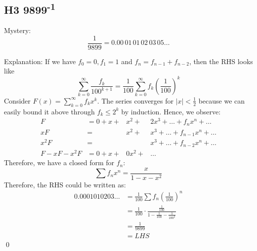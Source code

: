 \documentclass[12pt]{article}
\begin{document}
\subsection{H3 9899\textsuperscript{-1}}
Mystery: \[\frac{1}{9899}=0.00\,01\,01\,02\,03\,05\dots\]

Explanation: If we have $f_0=0, f_1=1$ and $f_n=f_{n-1}+f_{n-2}$, then the RHS looks like \[\sum_{k=0}^{\infty}\frac{f_k}{100^{k+1}}=\frac{1}{100}\sum_{k=0}^{\infty}f_k\left(\frac{1}{100}\right)^k\]
Consider \(F(x)=\sum_{k=0}^{\infty}f_kx^k\). The series converges for $|x|<\frac{1}{2}$ because we can easily bound it above through $f_k\leq 2^k$ by induction. Hence, we observe:\[\begin{array}{rlll}
    F &= 0+x+ & x^2+  & 2x^3+\dots +f_nx^n+\dots \\
    xF &= & x^2+ & x^3+\dots +f_{n-1}x^n+\dots\\
    x^2F &= & & x^3+\dots +f_{n-2}x^n+\dots\\ \hline
    F-xF-x^2F &= 0+x + & 0x^2 + &\dots
    \end{array}
    \]
Therefore, we have a closed form for $f_n$: \[\sum f_n x^n = \frac{x}{1-x-x^2}\]
Therefore, the RHS could be written as: \begin{align*}
    0.0001010203\dots &= \frac{1}{100}\sum f_n\left(\frac{1}{100}\right)^n\\
    &= \frac{1}{100}\cdot \frac{\frac{1}{100}}{1-\frac{1}{100}-\frac{1}{100^2}}\\
    &= \frac{1}{9899}\\
    &= LHS
\end{align*}\qed
\end{document}
